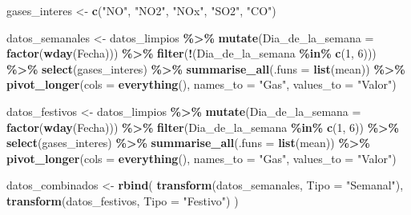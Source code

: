 \documentclass[notspecified,article,submit,moreauthors,pdftex]{Definitions/mdpi}
\newenvironment{Shaded}{\begin{snugshade}}{\end{snugshade}}
\newcommand{\AttributeTok}[1]{\textcolor[rgb]{0.13,0.29,0.53}{#1}}
\newcommand{\DecValTok}[1]{\textcolor[rgb]{0.00,0.00,0.81}{#1}}
\newcommand{\FunctionTok}[1]{\textcolor[rgb]{0.13,0.29,0.53}{\textbf{#1}}}
\newcommand{\NormalTok}[1]{#1}
\newcommand{\OtherTok}[1]{\textcolor[rgb]{0.56,0.35,0.01}{#1}}
\newcommand{\SpecialCharTok}[1]{\textcolor[rgb]{0.81,0.36,0.00}{\textbf{#1}}}
\newcommand{\StringTok}[1]{\textcolor[rgb]{0.31,0.60,0.02}{#1}}
\begin{document}
\begin{Shaded}
\begin{Highlighting}[]
\NormalTok{gases\_interes }\OtherTok{\textless{}{-}} \FunctionTok{c}\NormalTok{(}\StringTok{"NO"}\NormalTok{, }\StringTok{"NO2"}\NormalTok{, }\StringTok{"NOx"}\NormalTok{, }\StringTok{"SO2"}\NormalTok{, }\StringTok{"CO"}\NormalTok{)}

\NormalTok{datos\_semanales }\OtherTok{\textless{}{-}}\NormalTok{ datos\_limpios }\SpecialCharTok{\%\textgreater{}\%}
  \FunctionTok{mutate}\NormalTok{(}\AttributeTok{Dia\_de\_la\_semana =} \FunctionTok{factor}\NormalTok{(}\FunctionTok{wday}\NormalTok{(Fecha))) }\SpecialCharTok{\%\textgreater{}\%}
  \FunctionTok{filter}\NormalTok{(}\SpecialCharTok{!}\NormalTok{(Dia\_de\_la\_semana }\SpecialCharTok{\%in\%} \FunctionTok{c}\NormalTok{(}\DecValTok{1}\NormalTok{, }\DecValTok{6}\NormalTok{))) }\SpecialCharTok{\%\textgreater{}\%}
  \FunctionTok{select}\NormalTok{(gases\_interes) }\SpecialCharTok{\%\textgreater{}\%}
  \FunctionTok{summarise\_all}\NormalTok{(}\AttributeTok{.funs =} \FunctionTok{list}\NormalTok{(mean)) }\SpecialCharTok{\%\textgreater{}\%}
  \FunctionTok{pivot\_longer}\NormalTok{(}\AttributeTok{cols =} \FunctionTok{everything}\NormalTok{(),}
               \AttributeTok{names\_to =} \StringTok{"Gas"}\NormalTok{,}
               \AttributeTok{values\_to =} \StringTok{"Valor"}\NormalTok{)}

\NormalTok{datos\_festivos }\OtherTok{\textless{}{-}}\NormalTok{ datos\_limpios }\SpecialCharTok{\%\textgreater{}\%}
  \FunctionTok{mutate}\NormalTok{(}\AttributeTok{Dia\_de\_la\_semana =} \FunctionTok{factor}\NormalTok{(}\FunctionTok{wday}\NormalTok{(Fecha))) }\SpecialCharTok{\%\textgreater{}\%}
  \FunctionTok{filter}\NormalTok{(Dia\_de\_la\_semana }\SpecialCharTok{\%in\%} \FunctionTok{c}\NormalTok{(}\DecValTok{1}\NormalTok{, }\DecValTok{6}\NormalTok{)) }\SpecialCharTok{\%\textgreater{}\%}
  \FunctionTok{select}\NormalTok{(gases\_interes) }\SpecialCharTok{\%\textgreater{}\%}
  \FunctionTok{summarise\_all}\NormalTok{(}\AttributeTok{.funs =} \FunctionTok{list}\NormalTok{(mean)) }\SpecialCharTok{\%\textgreater{}\%}
  \FunctionTok{pivot\_longer}\NormalTok{(}\AttributeTok{cols =} \FunctionTok{everything}\NormalTok{(),}
               \AttributeTok{names\_to =} \StringTok{"Gas"}\NormalTok{,}
               \AttributeTok{values\_to =} \StringTok{"Valor"}\NormalTok{)}

\NormalTok{datos\_combinados }\OtherTok{\textless{}{-}} \FunctionTok{rbind}\NormalTok{(}
  \FunctionTok{transform}\NormalTok{(datos\_semanales, }\AttributeTok{Tipo =} \StringTok{"Semanal"}\NormalTok{),}
  \FunctionTok{transform}\NormalTok{(datos\_festivos, }\AttributeTok{Tipo =} \StringTok{"Festivo"}\NormalTok{)}
\NormalTok{)}


\end{Highlighting}
\end{Shaded}
\end{document}
